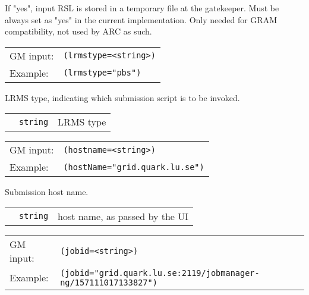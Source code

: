   If "yes", input RSL is stored in a temporary file at the
  gatekeeper. Must be always set as "yes" in the current implementation.
  Only needed for GRAM compatibility, not used by ARC as such.

  \hspace*{0.5cm}
  \begin{shaded}
  \end{shaded}
  \begin{tabular}{lp{13cm}}
    GM input:&\verb#(lrmstype=<string>)#\\
    Example:&\verb#(lrmstype="pbs")#\\
  \end{tabular}

  LRMS type, indicating which submission script is to be invoked. 

  \begin{tabular}{llp{10cm}}
    \hspace*{1cm}&\texttt{string} & LRMS type \\
  \end{tabular}

  \hspace*{0.5cm}
  \begin{shaded}
  \end{shaded}
  \begin{tabular}{lp{13cm}}
    GM input:&\verb#(hostname=<string>)#\\
    Example:&\verb#(hostName="grid.quark.lu.se")#\\
  \end{tabular}

  Submission host name. 

  \begin{tabular}{llp{10cm}}
    \hspace*{1cm}&\texttt{string} & host name, as passed by the UI\\
  \end{tabular}

  \hspace*{0.5cm}
  \begin{shaded}
  \end{shaded}
  \begin{tabular}{lp{13cm}}
    GM input:&\verb#(jobid=<string>)#\\
    Example:&\verb#(jobid="grid.quark.lu.se:2119/jobmanager-ng/157111017133827")#\\
  \end{tabular}

